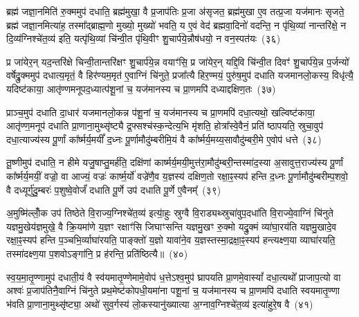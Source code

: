 {\anuvakamend[{इन्द्रः॑ प॒शुका॑मस्य भवत्यविश॒थ्सयो॑निं विꣳश॒तिश्च॑}]}%

ब्रह्म॑ जज्ञा॒नमिति॑ रु॒क्ममुप॑ दधाति॒ ब्रह्म॑मुखा॒ वै प्र॒जाप॑तिः प्र॒जा अ॑सृजत॒ ब्रह्म॑मुखा ए॒व तत्प्र॒जा यज॑मानः सृजते॒ ब्रह्म॑ जज्ञा॒नमित्या॑ह॒ तस्मा᳚द्ब्राह्म॒णो मुख्यो॒ मुख्यो॑ भवति॒ य ए॒वं वेद॑ ब्रह्मवा॒दिनो॑ वदन्ति॒ न पृ॑थि॒व्यां नान्तरि॑क्षे॒ न दि॒व्य॑ग्निश्चे॑त॒व्य॑ इति॒ यत्पृ॑थि॒व्यां चि॑न्वी॒त पृ॑थि॒वीꣳ शु॒चार्प॑ये॒न्नौष॑धयो॒ न वन॒स्पत॑यः~(३६)

प्र जा॑येर॒न् यद॒न्तरि॑क्षे चिन्वी॒तान्तरि॑क्षꣳ शु॒चार्प॑ये॒न्न वयाꣳ॑सि॒ प्र जा॑येर॒न् यद्दि॒वि चि॑न्वी॒त दिवꣳ॑ शु॒चार्प॑ये॒न्न प॒र्जन्यो॑ वर्\mbox{}षेद्रु॒क्ममुप॑ दधात्य॒मृतं॒ वै हिर॑ण्यम॒मृत॑ ए॒वाग्निं चि॑नुते॒ प्रजा᳚त्यै हिर॒ण्मयं॒ पुरु॑ष॒मुप॑ दधाति यजमानलो॒कस्य॒ विधृ॑त्यै॒ यदिष्ट॑काया॒ आतृ॑ण्णमनूपद॒ध्यात्प॑शू॒नां च॒ यज॑मानस्य च प्रा॒णमपि॑ दध्याद्दक्षिण॒तः~(३७)

प्राञ्च॒मुप॑ दधाति दा॒धार॑ यजमानलो॒कन्न प॑शू॒नां च॒ यज॑मानस्य च प्रा॒णमपि॑ दधा॒त्यथो॒ खल्विष्ट॑काया॒ आतृ॑ण्ण॒मनूप॑ दधाति प्रा॒णाना॒मुथ्सृ॑ष्ट्यै द्र॒फ्सश्च॑स्क॒न्देत्य॒भि मृ॑शति॒ होत्रा᳚स्वे॒वैनं॒ प्रति॑ ष्ठापयति॒ स्रुचा॒वुप॑ दधा॒त्याज्य॑स्य पू॒र्णां का᳚र्ष्मर्य॒मयीं᳚ द॒ध्नः पू॒र्णामौदु॑म्बरीमि॒यं वै का᳚र्ष्मर्य॒मय्य॒सावौदु॑म्बरी॒मे ए॒वोप॑ धत्ते~(३८)

तू॒ष्णीमुप॑ दधाति॒ न हीमे यजु॒षाप्तु॒मर्\mbox{}ह॑ति॒ दक्षि॑णां कार्ष्मर्य॒मयी॒मुत्त॑रा॒मौदु॑म्बरी॒न्तस्मा॑द॒स्या अ॒सावुत्त॒राज्य॑स्य पू॒र्णां का᳚र्ष्मर्य॒मयीं॒ वज्रो॒ वा आज्यं॒ वज्रः॑ कार्ष्म॒र्यो॑ वज्रे॑णै॒व य॒ज्ञस्य॑ दक्षिण॒तो रक्षा॒ꣴ॒स्यप॑ हन्ति द॒ध्नः पू॒र्णामौदु॑म्बरीम्प॒शवो॒ वै दध्यूर्गु॑दु॒म्बरः॑ प॒शुष्वे॒वोर्जं॑ दधाति पू॒र्णे उप॑ दधाति पू॒र्णे ए॒वैनम्᳚~(३९)

अ॒मुष्मि॑ल्लोँ॒क उप॑ तिष्ठेते वि॒राज्य॒ग्निश्चे॑त॒व्य॑ इत्या॒॑हुः स्रुग्वै वि॒राड्यथ्स्रुचा॑वुप॒दधा॑ति वि॒राज्ये॒वाग्निं चि॑नुते यज्ञमु॒खेय॑ज्ञमुखे॒ वै क्रि॒यमा॑णे य॒ज्ञꣳ रक्षाꣳ॑सि जिघाꣳसन्ति यज्ञमु॒खꣳ रु॒क्मो यद्रु॒क्मं व्या॑घा॒रय॑ति यज्ञमु॒खादे॒व रक्षा॒ꣴ॒स्यप॑ हन्ति प॒ञ्चभि॒र्व्याघा॑रयति॒ पाङ्क्तो॑ य॒ज्ञो यावा॑ने॒व य॒ज्ञस्तस्मा॒द्रक्षा॒ꣴ॒स्यप॑ हन्त्यक्ष्ण॒या व्याघा॑रयति॒ तस्मा॑दक्ष्ण॒या प॒शवो\-ऽङ्गा॑नि॒ प्र ह॑रन्ति॒ प्रति॑ष्ठित्यै॥~(४०)

{\anuvakamend[{वन॒स्पत॑यो दक्षिण॒तो ध॑त्त एन॒न्तस्मा॑दक्ष्ण॒या पञ्च॑ च}]}%

स्व॒य॒मा॒तृ॒ण्णामुप॑ दधाती॒यं वै स्व॑यमातृ॒ण्णेमामे॒वोप॑ ध॒त्ते\-ऽश्व॒मुप॑ घ्रापयति प्रा॒णमे॒वास्यां᳚ दधा॒त्यथो᳚ प्राजाप॒त्यो वा अश्वः॑ प्र॒जाप॑तिनै॒वाग्निं चि॑नुते प्रथ॒मेष्ट॑कोपधी॒यमा॑ना पशू॒नां च॒ यज॑मानस्य च प्रा॒णमपि॑ दधाति स्वयमातृ॒ण्णा भ॑वति प्रा॒णाना॒मुथ्सृ॑ष्ट्या॒ अथो॑ सुव॒र्गस्य॑ लो॒कस्यानु॑ख्यात्या अ॒ग्नाव॒ग्निश्चे॑त॒व्य॑ इत्या॑हुरे॒ष वै~(४१)

